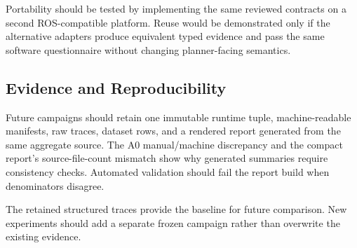 Portability should be tested by implementing the same reviewed contracts on a second ROS-compatible platform. Reuse would be demonstrated only if the alternative adapters produce equivalent typed evidence and pass the same software questionnaire without changing planner-facing semantics.

\subsection{Evidence and Reproducibility}

Future campaigns should retain one immutable runtime tuple, machine-readable manifests, raw traces, dataset rows, and a rendered report generated from the same aggregate source. The A0 manual/machine discrepancy and the compact report's source-file-count mismatch show why generated summaries require consistency checks. Automated validation should fail the report build when denominators disagree.

The retained structured traces provide the baseline for future comparison. New experiments should add a separate frozen campaign rather than overwrite the existing evidence.
